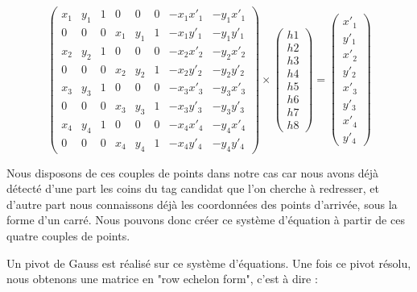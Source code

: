        \[
        \begin{pmatrix} 
            x_1 & y_1 & 1 & 0 & 0 & 0 & -x_1 x'_1 & -y_1 x'_1 \\ 
            0 & 0 & 0 & x_1 & y_1 & 1 & -x_1 y'_1 & -y_1 y'_1 \\
    
            x_2 & y_2 & 1 & 0 & 0 & 0 & -x_2 x'_2 & -y_2 x'_2 \\ 
            0 & 0 & 0 & x_2 & y_2 & 1 & -x_2 y'_2 & -y_2 y'_2 \\
    
            x_3 & y_3 & 1 & 0 & 0 & 0 & -x_3 x'_3 & -y_3 x'_3 \\ 
            0 & 0 & 0 & x_3 & y_3 & 1 & -x_3 y'_3 & -y_3 y'_3 \\
    
            x_4 & y_4 & 1 & 0 & 0 & 0 & -x_4 x'_4 & -y_4 x'_4 \\ 
            0 & 0 & 0 & x_4 & y_4 & 1 & -x_4 y'_4 & -y_4 y'_4
        \end{pmatrix} 
        \times
        \begin{pmatrix} h1 \\ h2 \\ h3 \\ h4 \\ h5 \\h6 \\ h7 \\ h8 \end{pmatrix}
        =
        \begin{pmatrix} x'_1 \\ y'_1 \\ x'_2 \\ y'_2 \\ x'_3 \\ y'_3 \\ x'_4 \\ y'_4 \end{pmatrix} 
        \]
    
        Nous disposons de ces couples de points dans notre cas car nous avons déjà détecté d'une part les coins du tag candidat que l'on cherche à redresser, et d'autre part nous connaissons déjà les coordonnées des points d'arrivée, sous la forme d'un carré. Nous pouvons donc créer ce système d'équation à partir de ces quatre couples de points.

        Un pivot de Gauss est réalisé sur ce système d'équations. Une fois ce pivot résolu, nous obtenons une matrice en "row echelon form", c'est à dire :
    

